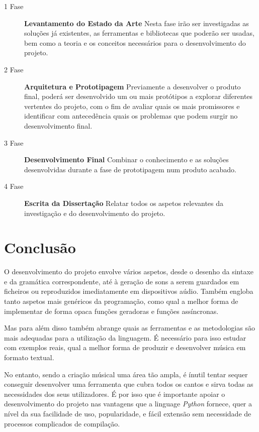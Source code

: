 \documentclass[
  oneside,
  11pt, a4paper,
  footinclude=true,
  headinclude=true,
  cleardoublepage=empty
]{scrbook}
\begin{document}
    \begin{description}
     \item[1\textordfeminine{} Fase] \textbf{Levantamento do Estado da Arte} Nesta fase irão ser investigadas as soluções já existentes, as ferramentas e bibliotecas que poderão ser usadas, bem como a teoria e os conceitos necessários para o desenvolvimento do projeto.
     \item[2\textordfeminine{} Fase] \textbf{Arquitetura e Prototipagem} Previamente a desenvolver o produto final, poderá ser desenvolvido um ou mais protótipos a explorar diferentes vertentes do projeto, com o fim de avaliar quais os mais promissores e identificar com antecedência quais os problemas que podem surgir no desenvolvimento final.
     \item[3\textordfeminine{} Fase] \textbf{Desenvolvimento Final} Combinar o conhecimento e as soluções desenvolvidas durante a fase de prototipagem num produto acabado.
     \item[4\textordfeminine{} Fase] \textbf{Escrita da Dissertação} Relatar todos os aspetos relevantes da investigação e do desenvolvimento do projeto.
    \end{description}

	\chapter{Conclusão}
	O desenvolvimento do projeto envolve vários aspetos, desde o desenho da sintaxe e da gramática correspondente, até à geração de sons a serem guardados em ficheiros ou reproduzidos imediatamente em dispositivos aúdio. Também engloba tanto aspetos mais genéricos da programação, como qual a melhor forma de implementar de forma opaca funções geradoras e funções assíncronas.
	
	Mas para além disso também abrange quais as ferramentas e as metodologias são mais adequadas para a utilização da linguagem. É necessário para isso estudar com exemplos reais, qual a melhor forma de produzir e desenvolver música em formato textual.
	
	No entanto, sendo a criação músical uma área tão ampla, é ínutil tentar sequer conseguir desenvolver uma ferramenta que cubra todos os cantos e sirva todas as necessidades dos seus utilizadores. É por isso que é importante apoiar o desenvolvimento do projeto nas vantagens que a linguage \textit{Python} fornece, quer a nível da sua facilidade de uso, popularidade, e fácil extensão sem necessidade de processos complicados de compilação.
	
\end{document}
